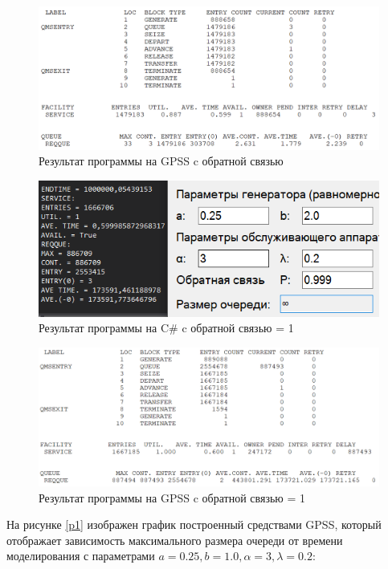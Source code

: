 \begin{figure}[!h]
	\includegraphics[width=1\linewidth]{inc/img/5.png}
	\caption{Результат программы на GPSS c обратной связью}
	\label{p5}
\end{figure}

\newpage
\begin{figure}[!h]
	\includegraphics[width=1\linewidth]{inc/img/6.png}
	\caption{Результат программы на C$\#$ c обратной связью = 1}
	\label{p6}
\end{figure}

\begin{figure}[!h]
	\includegraphics[width=1\linewidth]{inc/img/7.png}
	\caption{Результат программы на GPSS c обратной связью = 1}
	\label{p7}
\end{figure}

\newpage
На рисунке \ref{p1} изображен график построенный средствами GPSS, который отображает зависимость максимального размера очереди от времени моделирования с параметрами $a = 0.25, b = 1.0, \alpha = 3, \lambda = 0.2$:
\newline


